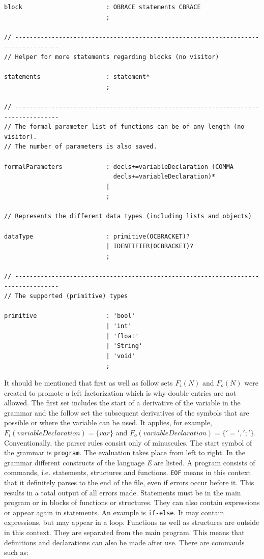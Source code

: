 \begin{lstlisting}[frame=htrbl, caption={Parser rules of grammar {\ttfamily E}}, label={lst:pe}, basicstyle=\scriptsize]
block                       : OBRACE statements CBRACE
                            ;

// ----------------------------------------------------------------------------------
// Helper for more statements regarding blocks (no visitor)

statements                  : statement*
                            ;

// ----------------------------------------------------------------------------------
// The formal parameter list of functions can be of any length (no visitor).
// The number of parameters is also saved.

formalParameters            : decls+=variableDeclaration (COMMA
                              decls+=variableDeclaration)*
                            |
                            ;

// Represents the different data types (including lists and objects)

dataType                    : primitive(OCBRACKET)?
                            | IDENTIFIER(OCBRACKET)?
                            ;

// ----------------------------------------------------------------------------------
// The supported (primitive) types

primitive                   : 'bool'
                            | 'int'
                            | 'float'
                            | 'String'
                            | 'void'
                            ;
\end{lstlisting}

It should be mentioned that first as well as follow sets $F_i(N)$ and $F_o(N)$ were created to promote a left factorization which is why double entries are not allowed. The first set includes the start of a derivative of the variable in the grammar and the follow set the subsequent derivatives of the symbols that are possible or where the variable can be used. It applies, for example, $F_i(variableDeclaration) = \{ var \}$ and $F_o(variableDeclaration) = \{ '=', ';' \}$. Conventionally, the parser rules consist only of minuscules. The start symbol of the grammar is \texttt{program}. The evaluation takes place from left to right. In the grammar different constructs of the language \emph{E} are listed. A program consists of commands, i.e. statements, structures and functions. \texttt{EOF} means in this context that it definitely parses to the end of the file, even if errors occur before it. This results in a total output of all errors made. Statements must be in the main program or in blocks of functions or structures. They can also contain expressions or appear again in statements. An example is \texttt{if-else}. It may contain expressions, but may appear in a loop. Functions as well as structures are outside in this context. They are separated from the main program. This means that definitions and declarations can also be made after use. There are commands such as:

